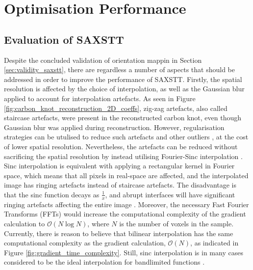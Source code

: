 \chapter{Optimisation Performance}\label{ch:optimisation_performance}

\section{Evaluation of SAXSTT}

Despite the concluded validation of orientation mappin in Section \ref{sec:validity_saxstt},
there are regardless a number of aspects that should be addressed in order to improve the performance of SAXSTT.
Firstly, the spatial resolution is affected by the choice of interpolation, as well as the Gaussian blur applied to account for interpolation artefacts.
As seen in Figure \ref{fig:carbon_knot_reconstruction_2D_coeffs}, zig-zag artefacts, also called staircase artefacts, were present in the reconstructed carbon knot, even though Gaussian blur was applied during reconstruction.
However, regularisation strategies can be utulised to reduce such artefacts and other outliers \cite{liebi2018small}, at the cost of lower spatial resolution.
Nevertheless, the artefacts can be reduced without sacrificing the spatial resolution by instead utilising Fourier-Sinc interpolation \cite{Sinc_interpolation_2016}.
Sinc interpolation is equivalent with applying a rectangular kernel in Fourier space, which means that all pixels in real-space are affected, and the interpolated image has ringing artefacts instead of staircase artefacts. %
The disadvantage is that the sinc function decays as $\frac{1}{x}$, and abrupt interfaces will have significant ringing artefacts affecting the entire image \cite{ipol.2011.g_lmii}. %
Moreover, the necessary Fast Fourier Transforms (FFTs) would increase the computational complexity of the gradient calculation to $\mathcal{O}(N\log{N})$,
where $N$ is the number of voxels in the sample. %
Currently, there is reason to believe that bilinear interpolation has the same computational complexity as the gradient calculation, $\mathcal{O}(N)$, as indicated in Figure \ref{fig:gradient_time_complexity}.
Still, sinc interpolation is in many cases considered to be the ideal interpolation for bandlimited functions \cite{ipol.2011.g_lmii}. %

